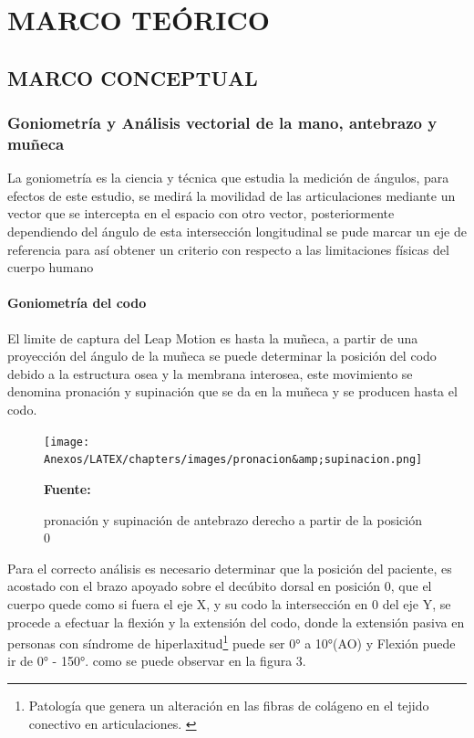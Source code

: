 \chapter{MARCO TEÓRICO}

\section{MARCO CONCEPTUAL}
\subsection{Goniometría y Análisis vectorial de la mano, antebrazo y muñeca}
La goniometría es la ciencia y técnica que estudia la medición de ángulos, para efectos de este estudio, se medirá la movilidad de las articulaciones mediante un vector que se intercepta en el espacio con otro vector, posteriormente dependiendo del ángulo de esta intersección longitudinal se pude marcar un eje de referencia para así obtener un criterio con respecto a las limitaciones físicas del cuerpo humano \parencite{Taboadela2007TaboadelaLaborales.}

\subsubsection{Goniometría del codo}
El limite de captura del Leap Motion es hasta la muñeca, a partir de una proyección del ángulo de la muñeca se puede determinar la posición del codo debido a la estructura osea y la membrana interosea, este movimiento se denomina pronación y supinación que se da en la muñeca y se producen hasta el codo.\parencite{Taboadela2007TaboadelaLaborales.} 

\begin{figure}[H]
    \centering
    \texttt{[image: Anexos/LATEX/chapters/images/pronacion\&amp;supinacion.png]}
    \caption{pronación y supinación de antebrazo derecho a partir de la posición 0}
    \small{\textbf{Fuente:} \parencite{Taboadela2007TaboadelaLaborales.} }
    \label{GONIOMETRIA_CODO_0}
\end{figure}


Para el correcto análisis es necesario determinar que la posición del paciente, es acostado con el brazo apoyado sobre el decúbito dorsal en posición 0, que el cuerpo quede como si fuera el eje X, y su codo la intersección en 0 del eje Y, se procede a efectuar la flexión y la extensión del codo, donde la extensión pasiva en personas con síndrome de hiperlaxitud\footnote{Patología que genera un alteración en las fibras de colágeno en el tejido conectivo en articulaciones. \parencite[1]{PedroRevistaClinic}} puede ser 0° a 10°(AO) y  Flexión puede ir de 0° - 150°. como se puede observar en la figura 3.

